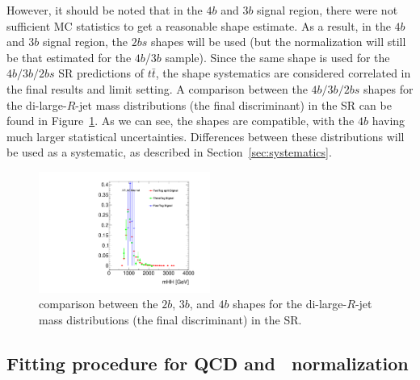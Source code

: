 However, it should be noted that in the $4b$ and $3b$ signal region, there were not sufficient MC statistics to get a reasonable shape estimate.  As a result, in the $4b$ and $3b$ signal region,  the $2bs$ shapes will be used (but the normalization will still be that estimated for the $4b$/$3b$ sample). Since the same shape is used for the $4b/3b/2bs$ SR predictions of $t\bar{t}$, the shape systematics are considered correlated in the final results and limit setting. A comparison between the $4b/3b/2bs$ shapes for the di-large-$R$-jet mass distributions (the final discriminant) in the SR can be found in Figure~\ref{fig:ttshapeComp}.  As we can see, the shapes are compatible, with the $4b$ having much larger statistical uncertainties.  Differences between these distributions will be used as a systematic, as described in Section~\ref{sec:systematics}.

\begin{figure}[htbp!]
\begin{center}
  \includegraphics[width=0.5\textwidth,angle=-90]{figures/boosted/Other/ttbar_compare_mHH_l.pdf}
\caption{comparison between the $2b$, $3b$, and $4b$ shapes for the di-large-$R$-jet mass distributions (the final discriminant) in the SR.}
\label{fig:ttshapeComp}
\end{center}
\end{figure}


\pagebreak{}
\subsection{Fitting procedure for QCD and \ttbar\ normalization}
\label{sec:ttbarnorm}

